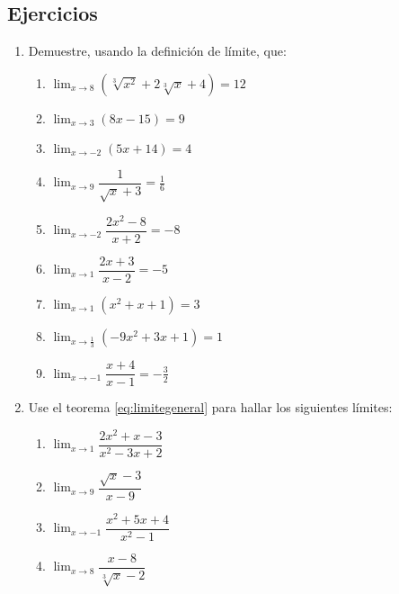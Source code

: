 \subsection{Ejercicios}
\begingroup
\small
\begin{multicols}{2}
\begin{enumerate}[leftmargin=*]
\item Demuestre, usando la definición de límite, que:
\begin{enumerate}[leftmargin=*]
\item $\displaystyle
	\lim_{x\to 8}(\sqrt[3]{x^2} + 2\sqrt[3]{x} + 4) = 12 $

\item $\displaystyle
	\lim_{x\to 3}(8x-15)=9
$
\item $\displaystyle
	\lim_{x\to -2}(5x+14)=4
$

\item $\displaystyle
	\lim_{x\to 9}\dfrac{1}{\sqrt{x} + 3} = \frac{1}{6}
$

\item $\displaystyle
	\lim_{x\to -2}\dfrac{2x^2-8}{x+2}=-8
$
\item $\displaystyle
	\lim_{x\to 1}\dfrac{2x + 3}{x - 2} = -5 $
\item $\displaystyle
	\lim_{x\to 1}(x^2+x+1)=3
$
\item $\displaystyle \lim_{x\to \frac{1}{3}}(-9x^2 + 3x + 1) = 1$

\item $\displaystyle
	\lim_{x\to -1}\dfrac{x + 4}{x - 1} = -\frac{3}{2}$
\end{enumerate}
\item Use el teorema \ref{eq:limitegeneral} para hallar los siguientes límites:
\begin{enumerate}[leftmargin=*]
\item $\displaystyle
	\lim_{x\to 1}\dfrac{2x^2+x-3}{x^2-3x+2}$

\item $\displaystyle
	\lim_{x\to 9}\dfrac{\sqrt{x}-3}{x-9}$

\item $\displaystyle
	\lim_{x\to -1}\dfrac{x^2+5x+4}{x^2-1}$

\item $\displaystyle
	\lim_{x\to 8}\dfrac{x-8}{\sqrt[3]{x}-2}$

\end{enumerate}
\end{enumerate}
\end{multicols}
\endgroup

